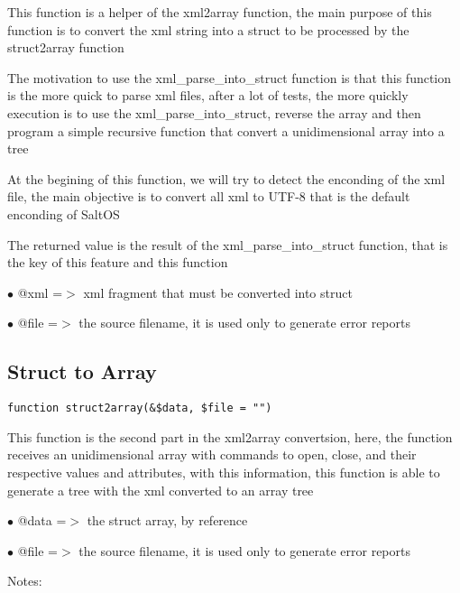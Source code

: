 \documentclass[a4paper]{book}
\begin{document}
This function is a helper of the xml2array function, the main purpose of this
function is to convert the xml string into a struct to be processed by the
struct2array function

The motivation to use the xml\_parse\_into\_struct function is that this function
is the more quick to parse xml files, after a lot of tests, the more quickly
execution is to use the xml\_parse\_into\_struct, reverse the array and then
program a simple recursive function that convert a unidimensional array into
a tree

At the begining of this function, we will try to detect the enconding of the
xml file, the main objective is to convert all xml to UTF-8 that is the default
enconding of SaltOS

The returned value is the result of the xml\_parse\_into\_struct function, that is
the key of this feature and this function

\begin{compactitem}
\item[\color{myblue}$\bullet$] @xml  =$>$ xml fragment that must be converted into struct
\item[\color{myblue}$\bullet$] @file =$>$ the source filename, it is used only to generate error reports
\end{compactitem}

\hypertarget{toc301}{}
\subsection{Struct to Array}

\begin{lstlisting}
function struct2array(&$data, $file = "")
\end{lstlisting}

This function is the second part in the xml2array convertsion, here, the function
receives an unidimensional array with commands to open, close, and their respective
values and attributes, with this information, this function is able to generate a
tree with the xml converted to an array tree

\begin{compactitem}
\item[\color{myblue}$\bullet$] @data =$>$ the struct array, by reference
\item[\color{myblue}$\bullet$] @file =$>$ the source filename, it is used only to generate error reports
\end{compactitem}

Notes:
\end{document}
